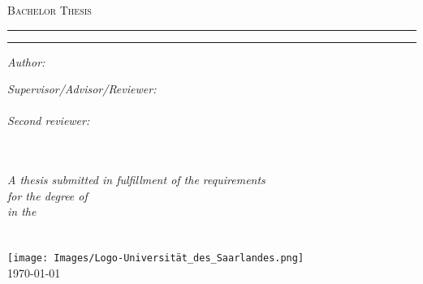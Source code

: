 \documentclass[
12pt, %
oneside, %
english, %
onehalfspacing, %
toctotoc, %
headsepline, %
chapterinoneline, %
]{MastersDoctoralThesis} %
\author{Daniel Gusenburger} %
\begin{document}
\frontmatter %

\pagestyle{plain} %


\begin{titlepage}
    \begin{center}
        {\scshape\LARGE \univname\par}\vspace{1cm} %
        \textsc{\Large Bachelor Thesis}\\[0.5cm] %
        \hrule
        \vspace{0.5cm}
        {\huge \bfseries \ttitle\par}
        \vspace{0.5cm} %
        \hrule
        \vspace{1.5cm}

        \begin{minipage}[t]{0.4\textwidth}
            \begin{flushleft} \large
                \emph{Author:}\\
                \authorname
            \end{flushleft}
        \end{minipage}
        \begin{minipage}[t]{0.5\textwidth}
            \begin{flushright} \large
                \emph{Supervisor/Advisor/Reviewer:} \\
                \supname\\[0.3cm]
                \emph{Second reviewer:}\\
                \examname\\
            \end{flushright}
        \end{minipage}\\[1cm]
        \large \textit{A thesis submitted in fulfillment of the requirements\\ for the degree of \degreename}\\[0.3cm] %
        \textit{in the}\\[0.3cm]
        \groupname\\\deptname\\[1cm] %
        \texttt{[image: Images/Logo-Universität\_des\_Saarlandes.png]} \\[1cm]
        \vfill
        {\large \today}
    \end{center}
\end{titlepage}
\end{document}
